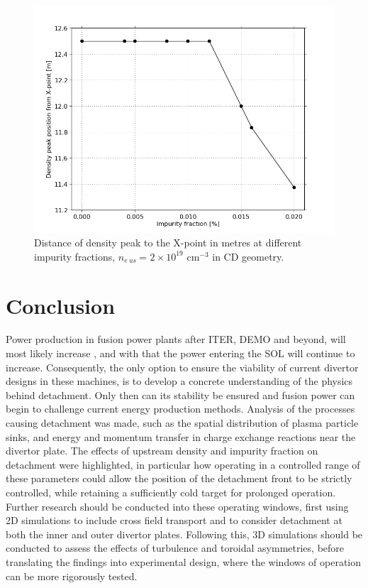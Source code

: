 \documentclass[12pt]{article}  %
\providecommand{\noNe}[1]{{${#1}\times 10^{19}$ cm$^{-3}$}} %
\providecommand{\neus}{$n_{e~us}~$} %
\begin{document}
\begin{figure}
	\includegraphics[scale=0.5]{Figures/sol1d/CvarPMne2.png}
	\centering
	\caption{Distance of density peak to the X-point in metres at different impurity fractions, \neus = \noNe{2} in CD geometry.}\label{figCvarPMne2}
\end{figure}



\section{Conclusion}\label{secConclusion}
Power production in fusion power plants after ITER, DEMO and beyond, will most likely increase \cite{Federici2014}, and with that the power entering the SOL will continue to increase. Consequently, the only option to ensure the viability of current divertor designs in these machines, is to develop a concrete understanding of the physics behind detachment. Only then can its stability be ensured and fusion power can begin to challenge current energy production methods. Analysis of the processes causing detachment was made, such as the spatial distribution of plasma particle sinks, and energy and momentum transfer in charge exchange reactions near the divertor plate. The effects of upstream density and impurity fraction on detachment were highlighted, in particular how operating in a controlled range of these parameters could allow the position of the detachment front to be strictly controlled, while retaining a sufficiently cold target for prolonged operation. Further research should be conducted into these operating windows, first using 2D simulations to include cross field transport and to consider detachment at both the inner and outer divertor plates. Following this, 3D simulations should be conducted to assess the effects of turbulence and toroidal asymmetries, before translating the findings into experimental design, where the windows of operation can be more rigorously tested.


\printbibliography
\end{document}
